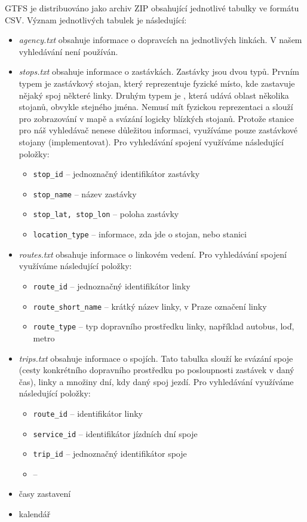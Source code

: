 GTFS je distribuováno jako archiv ZIP obsahující jednotlivé tabulky ve formátu
CSV. Význam jednotlivých tabulek je následující:
\begin{itemize}
\item {\em agency.txt} obsahuje informace o dopravcích na jednotlivých linkách.
V našem vyhledávání není používán.
\item {\em stops.txt} obsahuje informace o zastávkách. Zastávky jsou dvou typů.
Prvním typem je zastávkový stojan, který reprezentuje fyzické místo, kde
zastavuje nějaký spoj některé linky. Druhým typem je , která udává
oblast několika stojanů, obvykle stejného jména. Nemusí mít fyzickou
reprezentaci a slouží pro zobrazování v mapě a svázání logicky blízkých stojanů.
Protože stanice pro náš vyhledávač nenese důležitou informaci, využíváme pouze
zastávkové stojany (\TODO implementovat). Pro vyhledávání spojení využíváme
následující položky:
\begin{itemize}
	\item {\tt stop\_id} -- jednoznačný identifikátor zastávky
	\item {\tt stop\_name} -- název zastávky
	\item {\tt stop\_lat, stop\_lon} -- poloha zastávky
	\item {\tt location\_type} -- informace, zda jde o stojan, nebo stanici
\end{itemize}
\item {\em routes.txt} obsahuje informace o linkovém vedení. Pro vyhledávání
spojení využíváme následující položky:
\begin{itemize}
	\item {\tt route\_id} -- jednoznačný identifikátor linky
	\item {\tt route\_short\_name} -- krátký název linky, v Praze označení linky
	\item {\tt route\_type} -- typ dopravního prostředku linky, například autobus, loď, metro
\end{itemize}
\item {\em trips.txt} obsahuje informace o spojích. Tato tabulka slouží ke
svázání spoje (cesty konkrétního dopravního prostředku po posloupnosti zastávek
v daný čas), linky a množiny dní, kdy daný spoj jezdí. Pro vyhledávání využíváme
následující položky:
\begin{itemize}
	\item {\tt route\_id} -- identifikátor linky
	\item {\tt service\_id} -- identifikátor jízdních dní spoje
	\item {\tt trip\_id} -- jednoznačný identifikátor spoje
	\item {\tt } -- 
\end{itemize}
\item časy zastavení
\item kalendář
\end{itemize}

